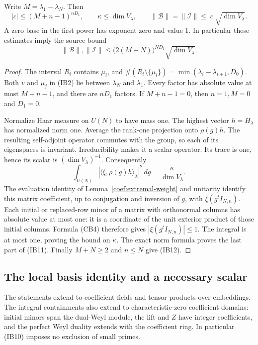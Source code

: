 \begin{proposition}\label{ib-norm-bound}
Write $M=\lambda_1-\lambda_N$.  Then
\[
 |c|\le(M+n-1)^{nD_1},\qquad
 \kappa\le\dim V_\lambda,\qquad
 \|\mathcal B\|=\|\mathcal I\|
                  \le |c|\sqrt{\dim V_\lambda}.
 \tag{IB11}
\]
A zero base in the first power has exponent zero
and value $1$.  In particular these estimates imply
the source bound
\[
 \|\mathcal B\|,\|\mathcal I\|
       \le\bigl(2(M+N)\bigr)^{ND_1}\sqrt{\dim V_\lambda}.
 \tag{IB12}
\]
\end{proposition}
\begin{proof}
The interval $R_i$ contains $\mu_i$, and
$\#(R_i\setminus\{\mu_i\})
=\min(\lambda_i-\lambda_{i+1},D_0)$.
Both $v$ and $\mu_j$ in (IB2) lie between $\lambda_N$
and $\lambda_1$.  Every factor has absolute value
at most $M+n-1$, and there are $nD_1$ factors.
If $M+n-1=0$, then $n=1,M=0$ and $D_1=0$.

Normalize Haar measure on $U(N)$ to have mass one.
The highest vector $h=H_\lambda$ has normalized norm one.
Average the rank-one projection onto $\rho(g)h$.
The resulting self-adjoint operator commutes with
the group, so each of its eigenspaces is invariant.
Irreducibility makes it a scalar operator.
Its trace is one, hence its scalar is $(\dim V_\lambda)^{-1}$.
Consequently
\[
 \int_{U(N)}|\langle\xi,\rho(g)h\rangle_\lambda|^2\,dg
                         =\frac{\kappa}{\dim V_\lambda}.
\]
The evaluation identity of
Lemma~\ref{coef:extremal-weight} and unitarity identify
this matrix coefficient, up to conjugation and
inversion of $g$, with $\xi(g^t I_{N,n})$.
Each initial or replaced-row minor of a matrix with
orthonormal columns has absolute value at most one:
it is a coordinate of the unit exterior product of
those initial columns.  Formula (CB4) therefore
gives $|\xi(g^tI_{N,n})|\le1$.
The integral is at most one, proving the bound
on $\kappa$.  The exact norm formula proves the
last part of (IB11).  Finally $M+N\ge2$ and $n\le N$
give (IB12).
\end{proof}

\subsection{The local basis identity and a necessary scalar}

The statements extend to coefficient fields and tensor
products over embeddings.  The integral containments
also extend to characteristic-zero coefficient domains:
initial minors span the dual-Weyl module, the lift
and $Z$ have integer coefficients, and the perfect
Weyl duality extends with the coefficient ring.
In particular (IB10) imposes no exclusion of small primes.

